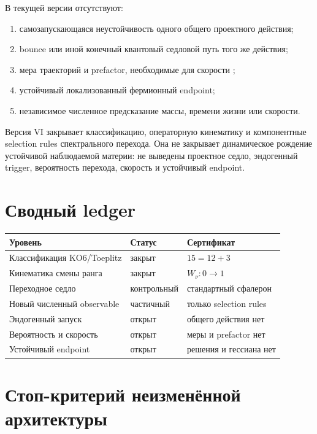 В текущей версии отсутствуют:
\begin{enumerate}
 \item самозапускающаяся неустойчивость одного общего проектного действия;
 \item bounce или иной конечный квантовый седловой путь того же действия;
 \item мера траекторий и prefactor, необходимые для скорости
 \cite{dynamic-status-coleman1977,dynamic-status-callan-coleman1977};
 \item устойчивый локализованный фермионный endpoint;
 \item независимое численное предсказание массы, времени жизни или скорости.
\end{enumerate}

\begin{theorem}
Версия VI закрывает классификацию, операторную кинематику и компонентные
selection rules спектрального перехода. Она не закрывает динамическое
рождение устойчивой наблюдаемой материи: не выведены проектное седло,
эндогенный trigger, вероятность перехода, скорость и устойчивый endpoint.
\end{theorem}

\section{Сводный ledger}

\begin{center}
\begin{tabular}{p{}p{}p{}}
\toprule
Уровень & Статус & Сертификат \\
\midrule
Классификация KO6/Toeplitz & закрыт & $15=12+3$ \\
Кинематика смены ранга & закрыт & $W_\nu:0\to1$ \\
Переходное седло & контрольный & стандартный сфалерон \\
Новый численный observable & частичный & только selection rules \\
Эндогенный запуск & открыт & общего действия нет \\
Вероятность и скорость & открыт & меры и prefactor нет \\
Устойчивый endpoint & открыт & решения и гессиана нет \\
\bottomrule
\end{tabular}
\end{center}

\section{Стоп-критерий неизменённой архитектуры}

